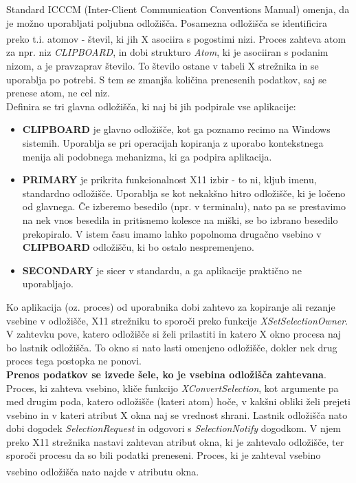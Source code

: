 \documentclass[12pt, A4]{article}
\begin{document}
	Standard ICCCM (Inter-Client Communication Conventions Manual) omenja, da je možno uporabljati poljubna odložišča. Posamezna odložišča se identificira preko t.i. atomov\textsuperscript{\cite{xdocs}} - števil, ki jih X asociira s pogostimi nizi. Proces zahteva atom za npr. niz \textit{CLIPBOARD}, in dobi strukturo \textit{Atom}, ki je asociiran s podanim nizom, a je pravzaprav število. To število ostane v tabeli X strežnika in se uporablja po potrebi. S tem se zmanjša količina prenesenih podatkov, saj se prenese atom, ne cel niz. \\
	
	Definira se tri glavna odložišča, ki naj bi jih podpirale vse aplikacije:
	\begin{itemize}
		\item \textbf{CLIPBOARD} je glavno odložišče, kot ga poznamo recimo na Windows sistemih. Uporablja se pri operacijah kopiranja z uporabo kontekstnega menija ali podobnega mehanizma, ki ga podpira aplikacija.
		\item \textbf{PRIMARY} je prikrita funkcionalnost X11 izbir - to ni, kljub imenu, standardno odložišče. Uporablja se kot nekakšno hitro odložišče, ki je ločeno od glavnega. Če izberemo besedilo (npr. v terminalu), nato pa se prestavimo na nek vnos besedila in pritisnemo kolesce na miški, se bo izbrano besedilo prekopiralo. V istem času imamo lahko popolnoma drugačno vsebino v \textbf{CLIPBOARD} odložišču, ki bo ostalo nespremenjeno.
		\item \textbf{SECONDARY} je sicer v standardu, a ga aplikacije praktično ne uporabljajo.
	\end{itemize}
	
	Ko aplikacija (oz. proces) od uporabnika dobi zahtevo za kopiranje ali rezanje vsebine v odložišče, X11 strežniku to sporoči preko funkcije \textit{XSetSelectionOwner}. V zahtevku pove, katero odložišče si želi prilastiti in katero X okno procesa naj bo lastnik odložišča. To okno si nato lasti omenjeno odložišče, dokler nek drug proces tega postopka ne ponovi. \\
		
	\textbf{Prenos podatkov se izvede šele, ko je vsebina odložišča zahtevana}. Proces, ki zahteva vsebino, kliče funkcijo \textit{XConvertSelection}, kot argumente pa med drugim poda, katero odložišče (kateri atom) hoče, v kakšni obliki želi prejeti vsebino in v kateri atribut X okna naj se vrednost shrani. Lastnik odložišča nato dobi dogodek \textit{SelectionRequest} in odgovori s \textit{SelectionNotify} dogodkom. V njem preko X11 strežnika nastavi zahtevan atribut okna, ki je zahtevalo odložišče, ter sporoči procesu da so bili podatki preneseni. Proces, ki je zahteval vsebino vsebino odložišča nato najde v atributu okna\textsuperscript{\cite{icccm}}.
\end{document}
